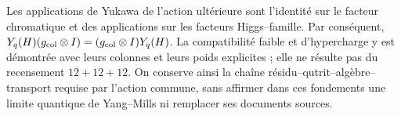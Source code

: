 Les applications de Yukawa de l’action ultérieure sont l’identité sur le facteur chromatique et des applications sur les facteurs Higgs--famille. Par conséquent, \(Y_q(H)(g_{\rm col}\otimes I)
=(g_{\rm col}\otimes I)Y_q(H)\). La compatibilité faible et d’hypercharge y est démontrée avec leurs colonnes et leurs poids explicites ; elle ne résulte pas du recensement \(12+12+12\). On conserve ainsi la chaîne résidu--qutrit--algèbre--transport requise par l’action commune, sans affirmer dans ces fondements une limite quantique de Yang--Mills ni remplacer ses documents sources.
